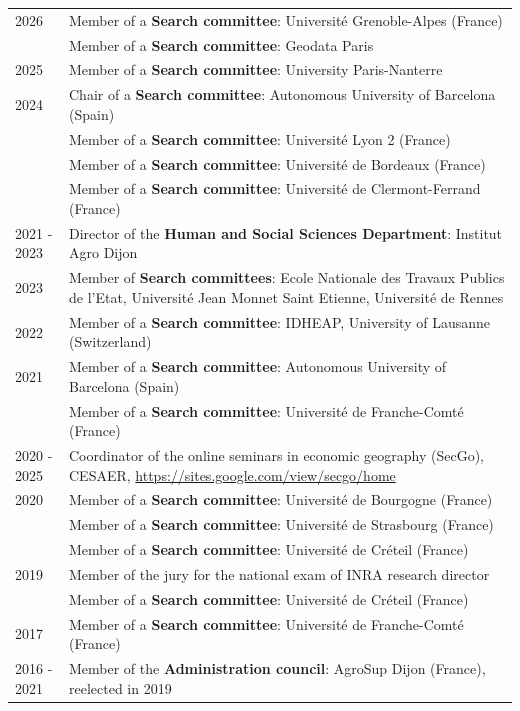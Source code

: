 \documentclass[a4paper,12pt]{article}
\begin{document}
\noindent \begin{longtable}{@{}p{\annee}p{\texte}@{}}
2026		& Member of a \textbf{Search committee}: Université Grenoble-Alpes (France) \\
		& Member of a \textbf{Search committee}: Geodata Paris \\
2025		& Member of a \textbf{Search committee}: University Paris-Nanterre \\
2024 & Chair of a \textbf{Search committee}: Autonomous University of Barcelona (Spain) \\
		& Member of a \textbf{Search committee}: Université Lyon 2 (France) \\
		& Member of a \textbf{Search committee}: Université de Bordeaux (France) \\
		& Member of a \textbf{Search committee}: Université de Clermont-Ferrand (France) \\
2021 - 2023 & Director of the \textbf{Human and Social Sciences Department}: Institut Agro Dijon \\
2023		& Member of \textbf{Search committees}: Ecole Nationale des Travaux Publics de l'Etat, Université Jean Monnet Saint Etienne, Université de Rennes \\
2022		& Member of a \textbf{Search committee}: IDHEAP, University of Lausanne (Switzerland) \\
2021		& Member of a \textbf{Search committee}: Autonomous University of Barcelona (Spain) \\
			& Member of a \textbf{Search committee}: Université de Franche-Comté (France) \\
2020 - 2025	& Coordinator of the online seminars in economic geography (SecGo), CESAER, \url{https://sites.google.com/view/secgo/home} \\
2020		& Member of a \textbf{Search committee}: Université de Bourgogne (France) \\
		& Member of a \textbf{Search committee}: Université de Strasbourg (France) \\
		& Member of a \textbf{Search committee}: Université de Créteil (France) \\
2019	& Member of the jury for the national exam of INRA research director \\
		& Member of a \textbf{Search committee}: Université de Créteil (France) \\
2017	& Member of a \textbf{Search committee}: Université de Franche-Comté (France) \\
2016 - 2021	& Member of the \textbf{Administration council}: AgroSup Dijon (France), reelected in 2019 \\

\end{longtable}
\end{document}
